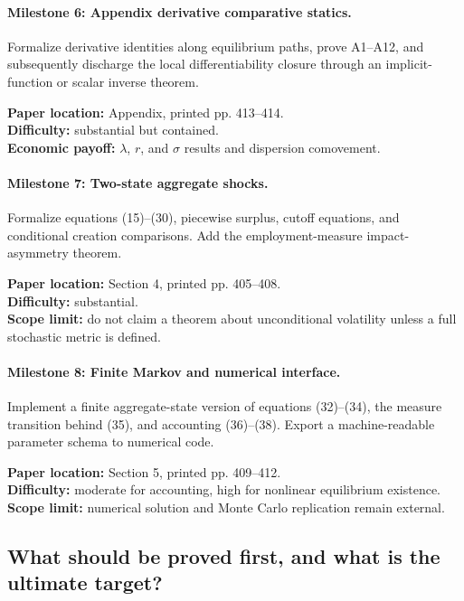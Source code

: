 \documentclass[11pt]{article}
\begin{document}
\paragraph{Milestone 6: Appendix derivative comparative statics.}
Formalize derivative identities along equilibrium paths, prove A1--A12, and subsequently discharge the local differentiability closure through an implicit-function or scalar inverse theorem.

\textbf{Paper location:} Appendix, printed pp. 413--414. \\
\textbf{Difficulty:} substantial but contained. \\
\textbf{Economic payoff:} $\lambda$, $r$, and $\sigma$ results and dispersion comovement.

\paragraph{Milestone 7: Two-state aggregate shocks.}
Formalize equations (15)--(30), piecewise surplus, cutoff equations, and conditional creation comparisons. Add the employment-measure impact-asymmetry theorem.

\textbf{Paper location:} Section 4, printed pp. 405--408. \\
\textbf{Difficulty:} substantial. \\
\textbf{Scope limit:} do not claim a theorem about unconditional volatility unless a full stochastic metric is defined.

\paragraph{Milestone 8: Finite Markov and numerical interface.}
Implement a finite aggregate-state version of equations (32)--(34), the measure transition behind (35), and accounting (36)--(38). Export a machine-readable parameter schema to numerical code.

\textbf{Paper location:} Section 5, printed pp. 409--412. \\
\textbf{Difficulty:} moderate for accounting, high for nonlinear equilibrium existence. \\
\textbf{Scope limit:} numerical solution and Monte Carlo replication remain external.

\subsection{What should be proved first, and what is the ultimate target?}
\end{document}
